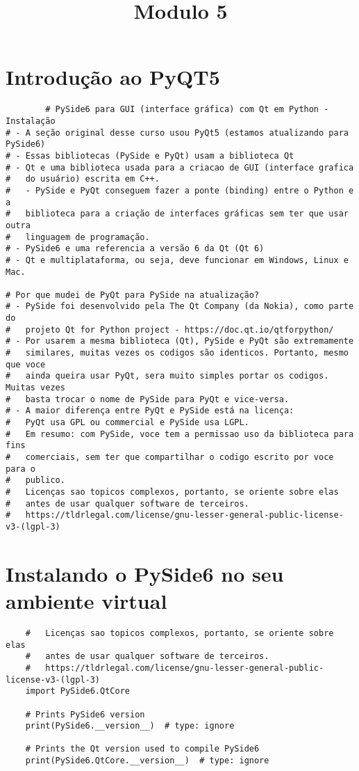 \documentclass[12pt,a4paper]{article}
\date{} %
\title{Modulo 5}
\begin{document}
    \maketitle
    \tableofcontents
    \newpage
    \section{Introdução ao PyQT5}
    \begin{lstlisting}
        # PySide6 para GUI (interface gráfica) com Qt em Python - Instalação
# - A seção original desse curso usou PyQt5 (estamos atualizando para PySide6)
# - Essas bibliotecas (PySide e PyQt) usam a biblioteca Qt
# - Qt e uma biblioteca usada para a criacao de GUI (interface grafica
#   do usuário) escrita em C++.
#   - PySide e PyQt conseguem fazer a ponte (binding) entre o Python e a
#   biblioteca para a criação de interfaces gráficas sem ter que usar outra
#   linguagem de programação.
# - PySide6 e uma referencia a versão 6 da Qt (Qt 6)
# - Qt e multiplataforma, ou seja, deve funcionar em Windows, Linux e Mac.

# Por que mudei de PyQt para PySide na atualização?
# - PySide foi desenvolvido pela The Qt Company (da Nokia), como parte do
#   projeto Qt for Python project - https://doc.qt.io/qtforpython/
# - Por usarem a mesma biblioteca (Qt), PySide e PyQt são extremamente
#   similares, muitas vezes os codigos são identicos. Portanto, mesmo que voce
#   ainda queira usar PyQt, sera muito simples portar os codigos. Muitas vezes
#   basta trocar o nome de PySide para PyQt e vice-versa.
# - A maior diferença entre PyQt e PySide está na licença:
#   PyQt usa GPL ou commercial e PySide usa LGPL.
#   Em resumo: com PySide, voce tem a permissao uso da biblioteca para fins
#   comerciais, sem ter que compartilhar o codigo escrito por voce para o
#   publico.
#   Licenças sao topicos complexos, portanto, se oriente sobre elas
#   antes de usar qualquer software de terceiros.
#   https://tldrlegal.com/license/gnu-lesser-general-public-license-v3-(lgpl-3)
    \end{lstlisting}

    \section{Instalando o PySide6 no seu ambiente virtual}
    \begin{lstlisting}
    #   Licenças sao topicos complexos, portanto, se oriente sobre elas
    #   antes de usar qualquer software de terceiros.
    #   https://tldrlegal.com/license/gnu-lesser-general-public-license-v3-(lgpl-3)
    import PySide6.QtCore

    # Prints PySide6 version
    print(PySide6.__version__)  # type: ignore

    # Prints the Qt version used to compile PySide6
    print(PySide6.QtCore.__version__)  # type: ignore
    \end{lstlisting}
\end{document}
